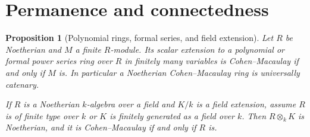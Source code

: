 \documentclass[11pt,oneside,openany]{book}
\newtheorem{proposition}[theorem]{Proposition}
\theoremstyle{definition}
\theoremstyle{remark}
\begin{document}
\section{Permanence and connectedness}

\begin{proposition}[Polynomial rings, formal series, and field extension]
\label{res:CM-15}
Let $R$ be Noetherian and $M$ a finite $R$-module.
Its scalar extension to a polynomial or formal power
series ring over $R$ in finitely many variables is
Cohen--Macaulay if and only if $M$ is. In particular a
Noetherian Cohen--Macaulay ring is universally catenary.

If $R$ is a Noetherian $k$-algebra over a field and
$K/k$ is a field extension, assume $R$ is of finite
type over $k$ or $K$ is finitely generated as a field
over $k$. Then $R\otimes_k K$ is Noetherian, and it is
Cohen--Macaulay if and only if $R$ is.
\end{proposition}
\end{document}
